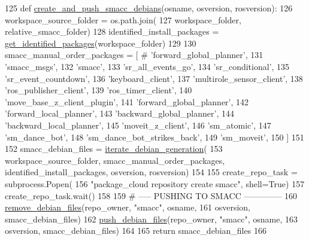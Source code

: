 \begin{DoxyCode}
125 \textcolor{keyword}{def }\hyperlink{namespacegenerate__debs_af7237c463c8e5b4df369e6befc154c50}{create\_and\_push\_smacc\_debians}(osname, osversion, rosversion):
126     workspace\_source\_folder = os.path.join(
127         workspace\_folder, relative\_smacc\_folder)
128     identified\_install\_packages = \hyperlink{namespacegenerate__debs_aa91b87c6d9c3ed04015845cc9298431a}{get\_identified\_packages}(workspace\_folder)
129 
130     smacc\_manual\_order\_packages = [  \textcolor{comment}{# 'forward\_global\_planner',}
131         \textcolor{stringliteral}{'smacc\_msgs'},
132         \textcolor{stringliteral}{'smacc'},
133         \textcolor{stringliteral}{'sr\_all\_events\_go'},
134         \textcolor{stringliteral}{'sr\_conditional'},
135         \textcolor{stringliteral}{'sr\_event\_countdown'},
136         \textcolor{stringliteral}{'keyboard\_client'},
137         \textcolor{stringliteral}{'multirole\_sensor\_client'},
138         \textcolor{stringliteral}{'ros\_publisher\_client'},
139         \textcolor{stringliteral}{'ros\_timer\_client'},
140         \textcolor{stringliteral}{'move\_base\_z\_client\_plugin'},
141         \textcolor{stringliteral}{'forward\_global\_planner'},
142         \textcolor{stringliteral}{'forward\_local\_planner'},
143         \textcolor{stringliteral}{'backward\_global\_planner'},
144         \textcolor{stringliteral}{'backward\_local\_planner'},        
145         \textcolor{stringliteral}{'moveit\_z\_client'},
146         \textcolor{stringliteral}{'sm\_atomic'},
147         \textcolor{stringliteral}{'sm\_dance\_bot'},
148         \textcolor{stringliteral}{'sm\_dance\_bot\_strikes\_back'},
149         \textcolor{stringliteral}{'sm\_moveit'},
150     ]
151 
152     smacc\_debian\_files = \hyperlink{namespacegenerate__debs_a2615a6fc7860b6aa9e920e6b4d886589}{iterate\_debian\_generation}(
153         workspace\_source\_folder, smacc\_manual\_order\_packages, identified\_install\_packages, osversion, 
      rosversion)
154 
155     create\_repo\_task = subprocess.Popen(
156         \textcolor{stringliteral}{"package\_cloud repository create smacc"}, shell=\textcolor{keyword}{True})
157     create\_repo\_task.wait()
158 
159     \textcolor{comment}{# ----- PUSHING TO SMACC --------------}
160     \hyperlink{namespacegenerate__debs_a08095040d038b3613ad0e77fd4e7f60e}{remove\_debian\_files}(repo\_owner, \textcolor{stringliteral}{"smacc"},  osname,
161                         osversion, smacc\_debian\_files)
162     \hyperlink{namespacegenerate__debs_a9b22f5ad65b40b7903c467eda308e575}{push\_debian\_files}(repo\_owner, \textcolor{stringliteral}{"smacc"},  osname,
163                       osversion, smacc\_debian\_files)
164 
165     \textcolor{keywordflow}{return} smacc\_debian\_files
166 
\end{DoxyCode}

